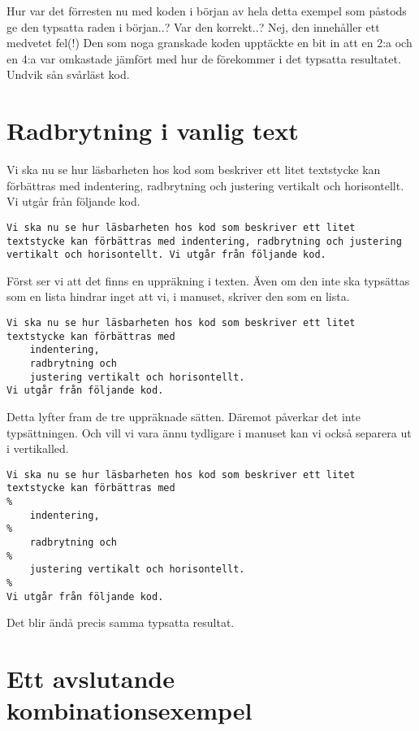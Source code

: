 \documentclass[a4paper,12pt]{article}
\begin{document}
Hur var det förresten nu med koden i början av hela detta
exempel som påstods ge den typsatta raden i början..? Var den
korrekt..? Nej, den innehåller ett medvetet fel(!) Den som noga
granskade koden upptäckte en bit in att en 2:a och en 4:a var
omkastade jämfört med hur de förekommer i det typsatta
resultatet. Undvik sån svårläst kod. 


\section{Radbrytning i vanlig text}


Vi ska nu se hur läsbarheten hos kod som beskriver ett litet
textstycke kan förbättras med indentering, radbrytning och justering 
vertikalt och horisontellt. Vi utgår från följande kod.  
%
\begin{lstlisting}
Vi ska nu se hur läsbarheten hos kod som beskriver ett litet
textstycke kan förbättras med indentering, radbrytning och justering 
vertikalt och horisontellt. Vi utgår från följande kod. 
\end{lstlisting}
%
Först ser vi att det finns en uppräkning i texten. Även om den inte
ska typsättas som en lista hindrar inget att vi, i manuset, skriver
den som en lista. 
%
\begin{lstlisting}
Vi ska nu se hur läsbarheten hos kod som beskriver ett litet
textstycke kan förbättras med 
    indentering, 
    radbrytning och 
    justering vertikalt och horisontellt. 
Vi utgår från följande kod. 
\end{lstlisting}
%
Detta lyfter fram de tre uppräknade sätten. Däremot påverkar det inte
typsättningen. Och vill vi vara ännu tydligare i manuset kan vi också
separera ut i vertikalled. 

%
\begin{lstlisting}
Vi ska nu se hur läsbarheten hos kod som beskriver ett litet
textstycke kan förbättras med 
%
    indentering, 
%
    radbrytning och 
%
    justering vertikalt och horisontellt. 
%
Vi utgår från följande kod. 
\end{lstlisting}
%
Det blir ändå precis samma typsatta resultat.


\section{Ett avslutande kombinationsexempel}
\end{document}
